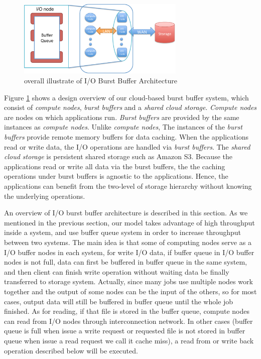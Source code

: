\begin{figure}[tb]
	\centering
	\includegraphics[width=8cm]{img/architecture_overview}
	\caption{overall illustrate of I/O Burst Buffer Architecture}
	\label{architecture:overview}
\end{figure}

Figure \ref{architecture:overview} shows a design overview of our cloud-based
burst buffer system, which consist of \emph{compute nodes}, \emph{burst buffers}
and a \emph{shared cloud storage}. \emph{Compute nodes} are nodes on which
applications run. \emph{Burst buffers} are provided by the same instances
as \emph{compute nodes}. Unlike \emph{compute nodes}, The instances
of the \emph{burst buffers} provide remote memory buffers for data caching.
When the applications read or write data, the I/O operations are handled via
\emph{burst buffers}.  The \emph{shared cloud storage} is persistent shared storage such as Amazon S3.
Because the applications read or write all data via the burst buffers, the
the caching operations under burst buffers is agnostic to the applications.
Hence, the applications can benefit from the two-level of storage hierarchy
without knowing the underlying operations.
 
An overview of I/O burst buffer architecture is described in this section.
As we mentioned in the previous section, our model takes advantage of high
throughput inside a system, and use buffer queue system in order to increase
throughput between two systems.
The main idea is that some of computing nodes serve as a I/O buffer nodes in
each system, for write I/O data, if buffer queue in I/O buffer nodes is not
full, data can first be buffered in buffer queue in the same system, and then
client can finish write operation without waiting data be finally transferred
to storage system.
Actually, since many jobs use multiple nodes work together and the output of
some nodes can be the input of the others, so for most cases, output data will
still be buffered in buffer queue until the whole job finished.
As for reading, if that file is stored in the buffer queue, compute nodes can
read from I/O nodes through interconnection network.
In other cases (buffer queue is full when issue a write request or requested
file is not stored in buffer queue when issue a read request we call it cache
miss), a read from or write back operation described below will be executed.

